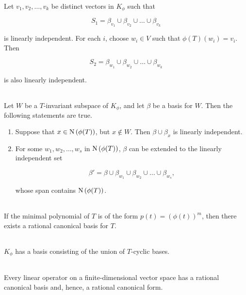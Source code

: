 \begin{theorem}
	\hfill\\
	Let $v_1, v_2, \dots, v_k$ be distinct vectors in $K_\phi$ such that

	\[S_1 = \beta_{v_1} \cup \beta_{v_2} \cup \dots \cup \beta_{v_k}\]

	is linearly independent. For each $i$, choose $w_i \in V$ such that $\phi(T)(w_i) = v_i$. Then

	\[S_2 = \beta_{w_1} \cup \beta_{w_2} \cup \dots \cup \beta_{w_k}\]

	is also linearly independent.
\end{theorem}

\begin{lemma}
	\hfill\\
	Let $W$ be a $T$-invariant subspace of $K_\phi$, and let $\beta$ be a basis for $W$. Then the following statements are true.

	\begin{enumerate}
		\item Suppose that $x \in \text{N}\left(\phi(T)\right)$, but $x \notin W$. Then $\beta \cup \beta_x$ is linearly independent.
		\item For some $w_1, w_2, \dots, w_s$ in $\text{N}\left(\phi(T)\right)$, $\beta$ can be extended to the linearly independent set

		      \[\beta' = \beta \cup \beta_{w_1} \cup \beta_{w_2} \cup \dots \cup \beta_{w_s},\]

		      whose span contains $\text{N}\left(\phi(T)\right)$.
	\end{enumerate}
\end{lemma}

\begin{theorem}
	\hfill\\
	If the minimal polynomial of $T$ is of the form $p(t) = (\phi(t))^m$, then there exists a rational canonical basis for $T$.
\end{theorem}

\begin{corollary}
	\hfill\\
	$K_\phi$ has a basis consisting of the union of $T$-cyclic bases.
\end{corollary}

\begin{theorem}
	\hfill\\
	Every linear operator on a finite-dimensional vector space has a rational canonical basis and, hence, a rational canonical form.
\end{theorem}

